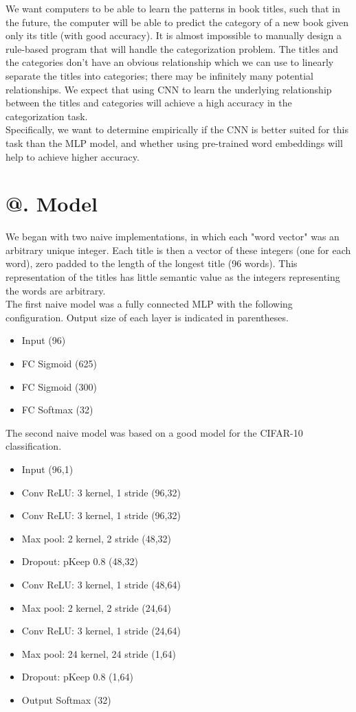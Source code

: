 \documentclass[jou,apacite, 10px]{apa6}
\makeatletter
\newcommand*{\rom}[1]{\expandafter\@slowromancap\romannumeral #1@}
\makeatother
\begin{document}
We want computers to be able to learn the patterns in book titles, such that in the future, the computer will be able to predict the category of a new book given only its title (with good accuracy). It is almost impossible to manually design a rule-based program that will handle the categorization problem. The titles and the categories don't have an obvious relationship which we can use to linearly separate the titles into categories; there may be infinitely many potential relationships. We expect that using CNN to learn the underlying relationship between the titles and categories will achieve a high accuracy in the categorization task.\\

Specifically, we want to determine empirically if the CNN is better suited for this task than the MLP model, and whether using pre-trained word embeddings will help to achieve higher accuracy.

\section{\rom{4}. Model}
We began with two naive implementations, in which each "word vector" was an arbitrary unique integer. Each title is then a vector of these integers (one for each word), zero padded to the length of the longest title (96 words). This representation of the titles has little semantic value as the integers representing the words are arbitrary.\\

The first naive model was a fully connected MLP with the following configuration. Output size of each layer is indicated in parentheses.

\begin{itemize}
    \item Input (96)
    \item FC Sigmoid (625)
    \item FC Sigmoid (300)
    \item FC Softmax (32)
\end{itemize}

The second naive model was based on a good model for the CIFAR-10 classification.

\begin{itemize}
    \item Input (96,1)
    \item Conv ReLU: 3 kernel, 1 stride (96,32)
    \item Conv ReLU: 3 kernel, 1 stride (96,32)
    \item Max pool: 2 kernel, 2 stride (48,32)
    \item Dropout: pKeep 0.8 (48,32)
    \item Conv ReLU: 3 kernel, 1 stride (48,64)
    \item Max pool: 2 kernel, 2 stride (24,64)
    \item Conv ReLU: 3 kernel, 1 stride (24,64)
    \item Max pool: 24 kernel, 24 stride (1,64)
    \item Dropout: pKeep 0.8 (1,64)
    \item Output Softmax (32)
\end{itemize}
\end{document}
